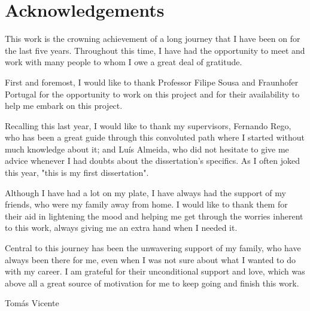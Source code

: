 \chapter*{Acknowledgements}

This work is the crowning achievement of a long journey that I have been on for the
last five years. Throughout this time, I have had the opportunity to meet and work
with many people to whom I owe a great deal of gratitude.

First and foremost, I would like to thank Professor Filipe Sousa and Fraunhofer Portugal
for the opportunity to work on this project and for their availability to help me
embark on this project.

Recalling this last year, I would like to thank my supervisors, Fernando Rego, who has
been a great guide through this convoluted path where I started without much knowledge
about it; and Luís Almeida, who did not hesitate to give me advice whenever I had
doubts about the dissertation's specifics. As I often joked this year, "this
is my first dissertation".

Although I have had a lot on my plate, I have always had the support of my friends, who
were my family away from home. I would like to thank them for their aid in lightening
the mood and helping me get through the worries inherent to this work, always giving 
me an extra hand when I needed it.

Central to this journey has been the unwavering support of my family, who have
always been there for me, even when I was not sure about what I wanted to do with my
career. I am grateful for their unconditional support and love, which was above all
a great source of motivation for me to keep going and finish this work.

\vspace{10mm}

\begin{flushleft}
Tomás Vicente
\end{flushleft}
